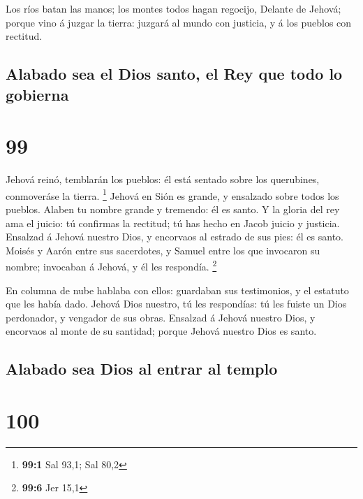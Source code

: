  Los ríos batan las manos; los montes todos hagan regocijo,
 Delante de Jehová; porque vino á juzgar la tierra: juzgará
al mundo con justicia, y á los pueblos con rectitud.

\hypertarget{alabado-sea-el-dios-santo-el-rey-que-todo-lo-gobierna}{%
\subsection{Alabado sea el Dios santo, el Rey que todo lo
gobierna}\label{alabado-sea-el-dios-santo-el-rey-que-todo-lo-gobierna}}

\hypertarget{section-98}{%
\section{99}\label{section-98}}

 Jehová reinó, temblarán los pueblos: él está sentado sobre
los querubines, conmoveráse la tierra. \footnote{\textbf{99:1} Sal 93,1;
  Sal 80,2}  Jehová en Sión es grande, y ensalzado sobre
todos los pueblos.  Alaben tu nombre grande y tremendo: él
es santo.  Y la gloria del rey ama el juicio: tú confirmas
la rectitud; tú has hecho en Jacob juicio y justicia. 
Ensalzad á Jehová nuestro Dios, y encorvaos al estrado de sus pies: él
es santo.  Moisés y Aarón entre sus sacerdotes, y Samuel
entre los que invocaron su nombre; invocaban á Jehová, y él les
respondía. \footnote{\textbf{99:6} Jer 15,1}

 En columna de nube hablaba con ellos: guardaban sus
testimonios, y el estatuto que les había dado.  Jehová Dios
nuestro, tú les respondías: tú les fuiste un Dios perdonador, y vengador
de sus obras.  Ensalzad á Jehová nuestro Dios, y encorvaos
al monte de su santidad; porque Jehová nuestro Dios es santo.

\hypertarget{alabado-sea-dios-al-entrar-al-templo}{%
\subsection{Alabado sea Dios al entrar al
templo}\label{alabado-sea-dios-al-entrar-al-templo}}

\hypertarget{section-99}{%
\section{100}\label{section-99}}

